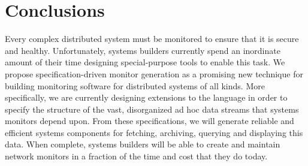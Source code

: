 \documentclass{sigplanconf}
\begin{document}
\section{Conclusions}
\label{sec:conclusion}

Every complex distributed system must be monitored to ensure that it is secure and healthy.  Unfortunately,
systems builders currently spend an inordinate amount of their time designing special-purpose tools
to enable this task.  We propose specification-driven monitor generation as a promising new technique for building
monitoring software for distributed systems of all kinds.  More specifically, we are currently designing 
extensions to the \pads{} language in order to specify the structure of the vast, disorganized ad hoc data streams
that systems monitors depend upon.  From these specifications, we will generate reliable and efficient systems
components for fetching, archiving, querying and displaying this data.  When complete, systems builders will
be able to create and maintain network monitors in a fraction of the time and cost that they do today.

{
\small

}
\end{document}
